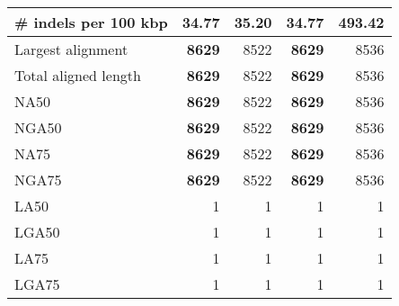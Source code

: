 \documentclass[12pt,a4paper]{article}
\begin{document}
\begin{table}[ht]
\begin{center}
\begin{tabular}{|l*{4}{|r}|}
\# indels per 100 kbp & {\bf 34.77} & 35.20 & {\bf 34.77} & 493.42 \\ \hline
Largest alignment & {\bf 8629} & 8522 & {\bf 8629} & 8536 \\ \hline
Total aligned length & {\bf 8629} & 8522 & {\bf 8629} & 8536 \\ \hline
NA50 & {\bf 8629} & 8522 & {\bf 8629} & 8536 \\ \hline
NGA50 & {\bf 8629} & 8522 & {\bf 8629} & 8536 \\ \hline
NA75 & {\bf 8629} & 8522 & {\bf 8629} & 8536 \\ \hline
NGA75 & {\bf 8629} & 8522 & {\bf 8629} & 8536 \\ \hline
LA50 & 1 & 1 & 1 & 1 \\ \hline
LGA50 & 1 & 1 & 1 & 1 \\ \hline
LA75 & 1 & 1 & 1 & 1 \\ \hline
LGA75 & 1 & 1 & 1 & 1 \\ \hline
\end{tabular}
\end{center}
\end{table}
\end{document}
